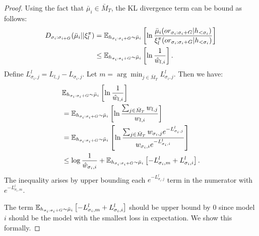 \begin{proof}
    
    Using the fact that $\bar{\mu}_i \in \bar{M}_T$, the KL divergence term can be bound as follows:
    \begin{align}
        D_{\sigma_i: \sigma_{i+G}} (\bar{\mu}_i || \xi^{\pi}_{l}) &= \mathbb{E}_{h_{\sigma_{i}:\sigma_{i}+G} \sim \bar{\mu}_i} \left[ \ln \frac{\bar{\mu}_i(or_{\sigma_i:\sigma_{i}+G} | h_{<\sigma_i})}{\xi^{\pi}_l(or_{\sigma_i:\sigma_{i}+G} | h_{<\sigma_i})} \right] \nonumber \\
        &\leq \mathbb{E}_{h_{\sigma_{i}:\sigma_{i}+G} \sim \bar{\mu}_i} \left[ \ln \frac{1}{\hat{w}_{l, i}} \right]. \label{eqn:mix_prior_bound}
    \end{align}
    Define $L_{\sigma_i, j}^{l} = L_{l, j} - L_{\sigma_i, j}$. 
    Let $m = \arg\min_{j \in \bar{M}_T} L_{\sigma_i, j}^{l}$. 
    Then we have:
    \begin{equation}
    \begin{split}
        &\mathbb{E}_{h_{\sigma_{i}:\sigma_{i}+G} \sim \bar{\mu}_i} \left[ \ln \frac{1}{\hat{w}_{l, i}} \right] \\
        &= \mathbb{E}_{h_{\sigma_{i}:\sigma_{i}+G} \sim \bar{\mu}_i} \left[ \ln \frac{\sum_{j \in \bar{M}_T} w_{l, j} }{w_{l, i}} \right]\\
        &= \mathbb{E}_{h_{\sigma_{i}:\sigma_{i}+G} \sim \bar{\mu}_i} \left[ \ln \frac{\sum_{j \in \bar{M}_T} w_{\sigma_i, j} e^{-L_{\sigma_i, j}^{l}} }{w_{\sigma_i, i} e^{-L_{\sigma_i, i}^{l}} } \right]\\
        &\leq \log \frac{1}{\hat{w}_{\sigma_i, i}} + \mathbb{E}_{h_{\sigma_{i}:\sigma_{i}+G} \sim \bar{\mu}_i} \left[ - L_{\sigma_i, m}^{l} + L_{\sigma_i, i}^{l}\right].
    \end{split}
    \end{equation}
    The inequality arises by upper bounding each $e^{-L_{\sigma_i,j}^{l}}$ term in the numerator with $e^{-L_{\sigma_i,m}^{l}}$. 
    
    The term $\mathbb{E}_{h_{\sigma_{i}:\sigma_{i}+G} \sim \bar{\mu}_i} \left[ - L_{\sigma_i, m}^{l} + L_{\sigma_i, i}^{l}\right]$ should be upper bound by 0 since model $i$ should be the model with the smallest loss in expectation. We show this formally.
    

\end{proof}
